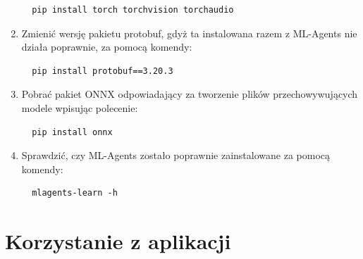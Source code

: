 \documentclass{SGGW-thesis}
\begin{document}
\begin{enumerate}
{\begin{lstlisting}
  pip install torch torchvision torchaudio
  \end{lstlisting}
  }
  \item{Zmienić wersję pakietu protobuf, gdyż ta instalowana razem z ML-Agents nie działa poprawnie, za pomocą komendy:
  \begin{lstlisting}
  pip install protobuf==3.20.3
  \end{lstlisting}
  }
  \item{Pobrać pakiet ONNX odpowiadający za tworzenie plików przechowywujących modele wpisując polecenie:
  \begin{lstlisting}
  pip install onnx
  \end{lstlisting}
  }
  \item{Sprawdzić, czy ML-Agents zostało poprawnie zainstalowane za pomocą komendy:
  \begin{lstlisting}
  mlagents-learn -h
  \end{lstlisting}
  }
\end{enumerate}

\section{Korzystanie z aplikacji}
\end{document}
